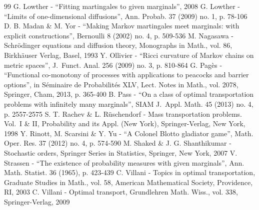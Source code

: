 \begin{thebibliography}{99}
 G. Lowther - “Fitting martingales to given marginals”, 2008
 G. Lowther - “Limits of one-dimensional diffusions”, Ann. Probab. 37 (2009) no. 1, p. 78-106
 D. B. Madan \& M. Yor - “Making Markov martingales meet marginals: with explicit constructions”, Bernoulli 8 (2002) no. 4, p. 509-536
 M. Nagasawa - Schrödinger equations and diffusion theory, Monographs in Math., vol. 86, Birkhäuser Verlag, Basel, 1993
 Y. Ollivier - “Ricci curvature of Markov chains on metric spaces”, J. Funct. Anal. 256 (2009) no. 3, p. 810-864
 G. Pagès - “Functional co-monotony of processes with applications to peacocks and barrier options”, in Séminaire de Probabilités XLV, Lect. Notes in Math., vol. 2078, Springer, Cham, 2013, p. 365-400
 B. Pass - “On a class of optimal transportation problems with infinitely many marginals”, SIAM J. Appl. Math. 45 (2013) no. 4, p. 2557-2575
 S. T. Rachev \& L. Rüschendorf - Mass transportation problems. Vol. I \& II, Probability and its Appl. (New York), Springer-Verlag, New York, 1998
 Y. Rinott, M. Scarsini \& Y. Yu - “A Colonel Blotto gladiator game”, Math. Oper. Res. 37 (2012) no. 4, p. 574-590
 M. Shaked \& J. G. Shanthikumar - Stochastic orders, Springer Series in Statistics, Springer, New York, 2007
 V. Strassen - “The existence of probability measures with given marginals”, Ann. Math. Statist. 36 (1965), p. 423-439
 C. Villani - Topics in optimal transportation, Graduate Studies in Math., vol. 58, American Mathematical Society, Providence, RI, 2003
 C. Villani - Optimal transport, Grundlehren Math. Wiss., vol. 338, Springer-Verlag, 2009
\end{thebibliography}

